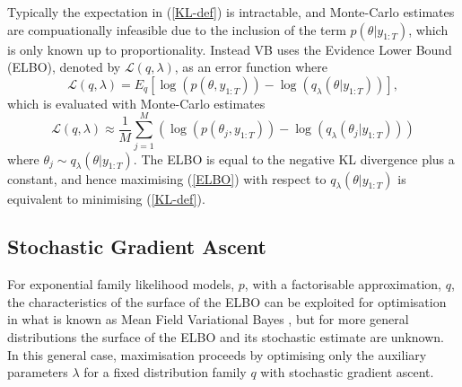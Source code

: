 \documentclass[12pt,a4paper]{article}\usepackage[]{graphicx}\usepackage[]{color}
\begin{document}
Typically the expectation in (\ref{KL-def}) is intractable, and Monte-Carlo estimates are compuationally infeasible due to the inclusion of the term $p(\theta | y_{1:T})$, which is only known up to proportionality. Instead VB uses the Evidence Lower Bound (ELBO), denoted by $\mathcal{L}(q, \lambda)$, as an error function where
\begin{equation}
\label{ELBO}
\mathcal{L}(q, \lambda) = E_q \left[\log(p(\theta, y_{1:T})) - \log(q_{\lambda}(\theta | y_{1:T}))\right],
\end{equation}
which is evaluated with Monte-Carlo estimates
\begin{equation}
\label{ELBO-MC}
\mathcal{L}(q, \lambda) \approx \frac{1}{M} \sum_{j=1}^M \left(\log(p(\theta_{j}, y_{1:T})) - \log(q_{\lambda}(\theta_{j} | y_{1:T})) \right)
\end{equation}
where $\theta_{j} \sim q_{\lambda}(\theta | y_{1:T})$. The ELBO is equal to the negative KL divergence plus a constant, and hence maximising (\ref{ELBO}) with respect to $q_{\lambda}(\theta | y_{1:T})$ is equivalent to minimising (\ref{KL-def}).

\subsection{Stochastic Gradient Ascent}
\label{subsec:SGA}
For exponential family likelihood models, $p$, with a factorisable approximation, $q$, the characteristics of the surface of the ELBO can be exploited for optimisation in what is known as Mean Field Variational Bayes \citep{Jordan1999, Ghahramani2000, Wainwright2008}, but for more general distributions the surface of the ELBO and its stochastic estimate are unknown. In this general case, maximisation proceeds by optimising only the auxiliary parameters $\lambda$ for a fixed distribution family $q$ with stochastic gradient ascent.
\\
\end{document}
